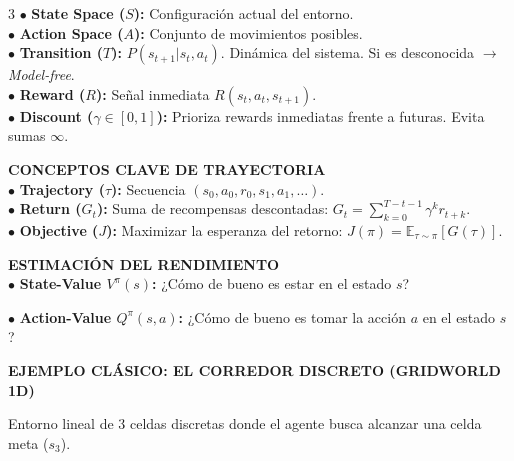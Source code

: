 \documentclass[8pt,a4paper,landscape,fleqn]{extarticle}
\begin{document}
\begin{multicols*}{3}
$\bullet$ \textbf{State Space ($S$):} Configuración actual del entorno.\\
$\bullet$ \textbf{Action Space ($A$):} Conjunto de movimientos posibles.\\
$\bullet$ \textbf{Transition ($T$):} $P(s_{t+1}|s_t, a_t)$. Dinámica del sistema. Si es desconocida $\rightarrow$ \textit{Model-free}.\\
$\bullet$ \textbf{Reward ($R$):} Señal inmediata $R(s_t, a_t, s_{t+1})$.\\
$\bullet$ \textbf{Discount ($\gamma\in [0,1]$):} Prioriza rewards inmediatas frente a futuras. Evita sumas $\infty$.

\textbf{CONCEPTOS CLAVE DE TRAYECTORIA}\\
$\bullet$ \textbf{Trajectory ($\tau$):} Secuencia $(s_0, a_0, r_0, s_1, a_1, \dots)$.\\
$\bullet$ \textbf{Return ($G_t$):} Suma de recompensas descontadas: $G_t = \sum_{k=0}^{T-t-1} \gamma^k r_{t+k}$.\\
$\bullet$ \textbf{Objective ($J$):} Maximizar la esperanza del retorno: $J(\pi) = \mathbb{E}_{\tau \sim \pi} [G(\tau)]$.


\textbf{ESTIMACIÓN DEL RENDIMIENTO}\\
$\bullet$ \textbf{State-Value $V^\pi(s)$:} ¿Cómo de bueno es estar en el estado $s$?

$\bullet$ \textbf{Action-Value $Q^\pi(s, a)$:} ¿Cómo de bueno es tomar la acción $a$ en el estado $s$?



\textbf{EJEMPLO CLÁSICO: EL CORREDOR DISCRETO (GRIDWORLD 1D)}

Entorno lineal de 3 celdas discretas donde el agente busca alcanzar una celda meta ($s_3$).
\vspace{-2mm}
\begin{center}
\end{center}
\end{multicols*}
\end{document}
